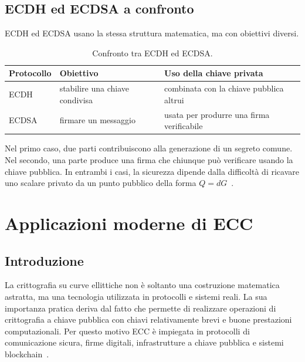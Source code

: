 \documentclass[12pt,a4paper,oneside]{report}
\begin{document}
\section{ECDH ed ECDSA a confronto}

ECDH ed ECDSA usano la stessa struttura matematica, ma con obiettivi diversi.

\begin{table}[h]
\centering
\begin{tabular}{lll}
\toprule
\textbf{Protocollo} & \textbf{Obiettivo} & \textbf{Uso della chiave privata} \\
\midrule
ECDH & stabilire una chiave condivisa & combinata con la chiave pubblica altrui \\
ECDSA & firmare un messaggio & usata per produrre una firma verificabile \\
\bottomrule
\end{tabular}
\caption{Confronto tra ECDH ed ECDSA.}
\label{tab:ecdh-ecdsa}
\end{table}

Nel primo caso, due parti contribuiscono alla generazione di un segreto comune. Nel secondo, una parte produce una firma che chiunque può verificare usando la chiave pubblica. In entrambi i casi, la sicurezza dipende dalla difficoltà di ricavare uno scalare privato da un punto pubblico della forma \(Q=dG\)~\cite{margara_ec,sec1}.

\chapter{Applicazioni moderne di ECC}

\section{Introduzione}

La crittografia su curve ellittiche non è soltanto una costruzione matematica astratta, ma una tecnologia utilizzata in protocolli e sistemi reali. La sua importanza pratica deriva dal fatto che permette di realizzare operazioni di crittografia a chiave pubblica con chiavi relativamente brevi e buone prestazioni computazionali. Per questo motivo ECC è impiegata in protocolli di comunicazione sicura, firme digitali, infrastrutture a chiave pubblica e sistemi blockchain~\cite{margara_ssl,margara_bitcoin,sec1}.
\end{document}
